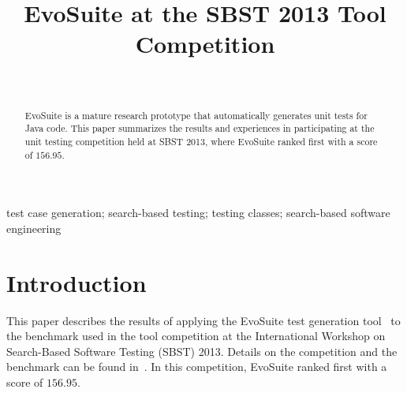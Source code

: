 \documentclass[10pt,conference,compsocconf]{IEEEtran}
\newcommand{\EVOSUITE}{{\sc EvoSuite}\xspace}
\begin{document}
\title{EvoSuite at the SBST 2013 Tool Competition}

\author{
\\
\and
{}
}

\maketitle

\begin{abstract}
  \EVOSUITE is a mature research prototype that automatically
  generates unit tests for Java code.  This paper summarizes the
  results and experiences in participating at the unit testing
  competition held at SBST 2013, where \EVOSUITE ranked first with a
  score of $156.95$.
\end{abstract}

\begin{IEEEkeywords}
  test case generation; search-based testing; testing classes;
  search-based software engineering
\end{IEEEkeywords}


\section{Introduction}

This paper describes the results of applying the \EVOSUITE test
generation tool~\cite{FrA11c} to the benchmark used in the tool
competition at the International Workshop on Search-Based Software
Testing (SBST) 2013.  Details on the competition and the benchmark can
be found in~\cite{sbst2013}. In this competition, \EVOSUITE ranked
first with a score of $156.95$.

\end{document}
